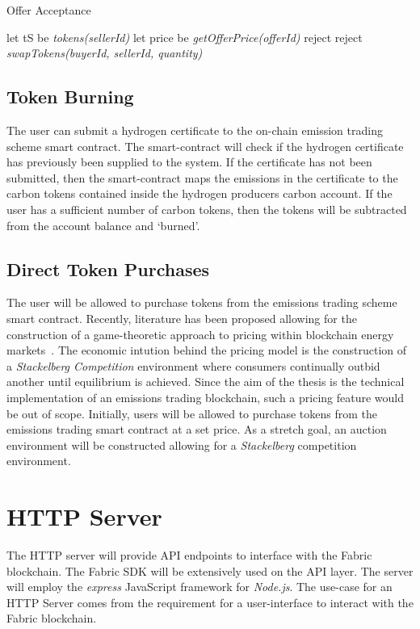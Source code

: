 \begin{algorithm}
    \caption{Offer Acceptance}
    \begin{algorithmic}[1]
        \State let tS be \textit{tokens(sellerId)}
        \State let price be \textit{getOfferPrice(offerId)}
        reject
        \EndIf
        reject
        \EndIf
        \State \textit{swapTokens(buyerId, sellerId, quantity)}
        \EndProcedure
    \end{algorithmic}
    \label{alg:offer}
\end{algorithm}

\subsection{Token Burning}
The user can submit a hydrogen certificate to the
on-chain emission trading scheme smart contract. The smart-contract will
check if the hydrogen certificate
has previously been supplied to the system. If the
certificate has not been submitted, then the smart-contract
maps the emissions in the certificate to the carbon tokens
contained inside the hydrogen producers carbon account. If the
user has a sufficient number of carbon tokens, then the tokens
will be subtracted from the account balance and `burned'.

\subsection{Direct Token Purchases}
The user will be allowed to purchase tokens from the
emissions trading scheme smart contract. Recently, literature
has been proposed allowing for the
construction of a game-theoretic approach to
pricing within blockchain energy markets~\cite{JIANG2020115239}.
The economic intution behind the pricing model is the
construction of a \textit{Stackelberg Competition} environment
where consumers continually outbid another until
equilibrium is achieved. Since the aim of the thesis
is the technical implementation of an emissions trading
blockchain, such a pricing feature would be out of scope.
Initially, users will be allowed to purchase tokens from the
emissions trading smart contract at a set price. As a
stretch goal, an auction environment will be constructed
allowing for a \textit{Stackelberg} competition
environment.

\section{HTTP Server}
The HTTP server will provide API endpoints to interface
with the Fabric blockchain. The Fabric SDK will be
extensively used on the API layer. The server will
employ the \textit{express} JavaScript framework
for \textit{Node.js}. The use-case for an HTTP Server
comes from the requirement for a user-interface to
interact with the Fabric blockchain.

